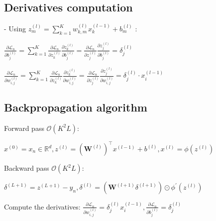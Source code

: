 
\subsection*{Derivatives computation}


- Using $z_{m}^{(l)}=\sum_{k=1}^{K} w_{k, m}^{(l)} x_{k}^{(l-1)}+b_{m}^{(l)}$ :

$\frac{\partial \mathscr{L}_{n}}{\partial b_{j}^{(l)}}=\sum_{k=1}^{K} \frac{\partial \mathscr{L}_{n}}{\partial z_{k}^{(l)}} \frac{\partial z_{k}^{(l)}}{\partial b_{j}^{(l)}}=\frac{\partial \mathscr{L}_{n}}{\partial z_{j}^{(l)}} \frac{\partial z_{j}^{(l)}}{\partial b_{j}^{(l)}}=\delta_{j}^{(l)}$

$\frac{\partial \mathscr{L}_{n}}{\partial w_{i, j}^{(l)}}=\sum_{k=1}^{K} \frac{\partial \mathscr{L}_{n}}{\partial z_{k}^{(l)}} \frac{\partial z_{k}^{(l)}}{\partial w_{i, j}^{(l)}}=\frac{\partial \mathscr{L}_{n}}{\partial z_{j}^{(l)}} \frac{\partial z_{j}^{(l)}}{\partial w_{i, j}^{(l)}} =\delta_{j}^{(l)} \cdot x_{i}^{(l-1)}$

\subsection*{Backpropagation algorithm}
Forward pass $\mathcal{O}\left(K^{2} L\right)$:

$
x^{(0)}=x_{n} \in \mathbb{R}^{d},
z^{(l)}=\left(\mathbf{W}^{(l)}\right)^{\top} x^{(l-1)}+b^{(l)},
x^{(l)}=\phi\left(z^{(l)}\right)
$

Backward pass $\mathcal{O}\left(K^{2} L\right)$:

$
\delta^{(L+1)}=z^{(L+1)}-y_{n},
\delta^{(l)}=\left(\mathbf{W}^{(l+1)} \delta^{(l+1)}\right) \odot \phi^{\prime}\left(z^{(l)}\right)
$



Compute the derivatives:
$
\frac{\partial \mathscr{L}_{n}}{\partial w_{i, j}^{(l)}}=\delta_{j}^{(l)} x_{i}^{(l-1)},
\frac{\partial \mathscr{L}_{n}}{\partial b_{j}^{(l)}}=\delta_{j}^{(l)}
$


